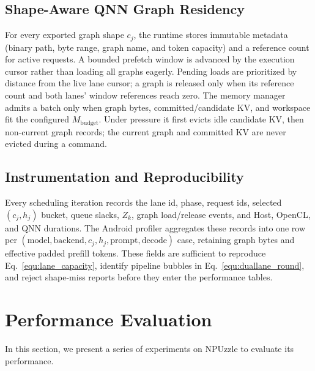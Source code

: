 \documentclass[sigconf,nonacm,10pt]{acmart}
\newcommand{\name}{NPUzzle\xspace}
\begin{document}
{{\subsection{Shape-Aware QNN Graph Residency}
For every exported graph shape $c_j$, the runtime stores immutable metadata
(binary path, byte range, graph name, and token capacity) and a reference count
for active requests.  A bounded prefetch window is advanced by the execution
cursor rather than loading all graphs eagerly.  Pending loads are prioritized
by distance from the live lane cursor; a graph is released only when its
reference count and both lanes' window references reach zero.  The memory
manager admits a batch only when graph bytes, committed/candidate KV, and
workspace fit the configured $M_{\mathrm{budget}}$.  Under pressure it first
evicts idle candidate KV, then non-current graph records; the current graph
and committed KV are never evicted during a command.

\subsection{Instrumentation and Reproducibility}
Every scheduling iteration records the lane id, phase, request ids, selected
$(c_j,h_j)$ bucket, queue slacks, $Z_k$, graph load/release events, and Host,
OpenCL, and QNN durations.  The Android profiler aggregates these records into
one row per $(\text{model},\text{backend},c_j,h_j,\text{prompt},\text{decode})$
case, retaining graph bytes and effective padded prefill tokens.  These fields
are sufficient to reproduce Eq.~\eqref{equ:lane_capacity}, identify pipeline
bubbles in Eq.~\eqref{equ:duallane_round}, and reject shape-miss reports before
they enter the performance tables.

\section{Performance Evaluation}
In this section, we present a series of experiments on \name to evaluate its performance.

}}
\end{document}
